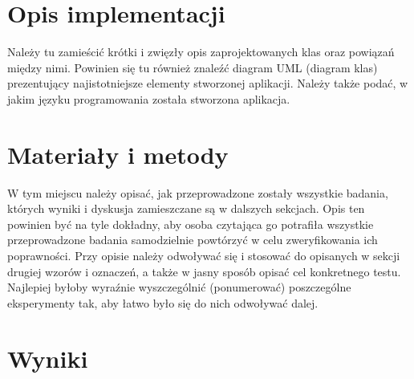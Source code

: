 \documentclass{classrep}
\begin{document}
\section{Opis implementacji}
{\color{blue}
Należy tu zamieścić krótki i zwięzły opis zaprojektowanych klas oraz powiązań
między nimi. Powinien się tu również znaleźć diagram UML (diagram klas)
prezentujący najistotniejsze elementy stworzonej aplikacji. Należy także podać,
w jakim języku programowania została stworzona aplikacja.}

\section{Materiały i metody}
{\color{blue}
W tym miejscu należy opisać, jak przeprowadzone zostały wszystkie badania,
których wyniki i dyskusja zamieszczane są w dalszych sekcjach. Opis ten
powinien być na tyle dokładny, aby osoba czytająca go potrafiła wszystkie
przeprowadzone badania samodzielnie powtórzyć w celu zweryfikowania ich
poprawności. Przy opisie należy odwoływać się i stosować do
opisanych w sekcji drugiej wzorów i oznaczeń, a także w jasny sposób opisać
cel konkretnego testu. Najlepiej byłoby wyraźnie wyszczególnić (ponumerować)
poszczególne eksperymenty tak, aby łatwo było się do nich odwoływać dalej.}

\section{Wyniki}
\end{document}
